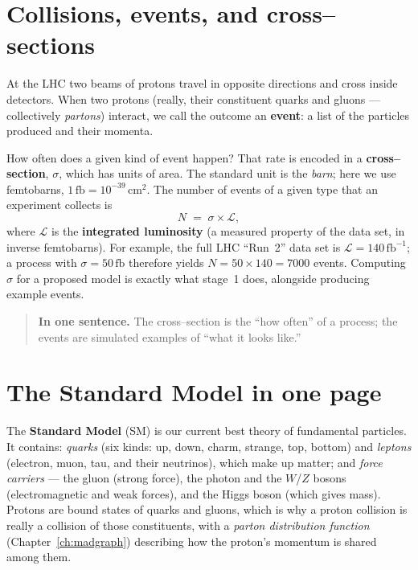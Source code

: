 \documentclass[11pt,oneside]{report}
\newcommand{\fb}{\,\text{fb}}
\begin{document}
\section{Collisions, events, and cross--sections}
At the LHC two beams of protons travel in opposite directions and cross inside detectors. When two
protons (really, their constituent quarks and gluons --- collectively \emph{partons}) interact, we
call the outcome an \textbf{event}: a list of the particles produced and their momenta.

How often does a given kind of event happen? That rate is encoded in a \textbf{cross--section},
$\sigma$, which has units of area. The standard unit is the \emph{barn}; here we use femtobarns,
$1\fb = 10^{-39}\,\text{cm}^2$. The number of events of a given type that an experiment collects is
\begin{equation}
  N \;=\; \sigma \times \mathcal{L},
  \label{eq:nsigma}
\end{equation}
where $\mathcal{L}$ is the \textbf{integrated luminosity} (a measured property of the data set, in
inverse femtobarns). For example, the full LHC ``Run~2'' data set is $\mathcal{L}=140\,\text{fb}^{-1}$;
a process with $\sigma = 50\fb$ therefore yields $N = 50 \times 140 = 7000$ events. Computing
$\sigma$ for a proposed model is exactly what stage~1 does, alongside producing example events.

\begin{quote}\textbf{In one sentence.} The cross--section is the ``how often'' of a process; the
events are simulated examples of ``what it looks like.''\end{quote}

\section{The Standard Model in one page}
The \textbf{Standard Model} (SM) is our current best theory of fundamental particles. It contains:
\emph{quarks} (six kinds: up, down, charm, strange, top, bottom) and \emph{leptons} (electron,
muon, tau, and their neutrinos), which make up matter; and \emph{force carriers} --- the gluon
(strong force), the photon and the $W$/$Z$ bosons (electromagnetic and weak forces), and the Higgs
boson (which gives mass). Protons are bound states of quarks and gluons, which is why a proton
collision is really a collision of those constituents, with a \emph{parton distribution function}
(Chapter~\ref{ch:madgraph}) describing how the proton's momentum is shared among them.
\end{document}
